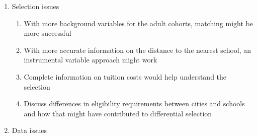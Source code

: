 \begin{enumerate}
	\item Selection issues
	\begin{enumerate}
		\item With more background variables for the adult cohorts, matching might be more successful
		\item With more accurate information on the distance to the nearest school, an instrumental variable approach might work
		\item Complete information on tuition costs would help understand the selection
		\item Discuss differences in eligibility requirements between cities and schools and how that might have contributed to differential selection
	\end{enumerate}
	\item Data issues
\end{enumerate}


